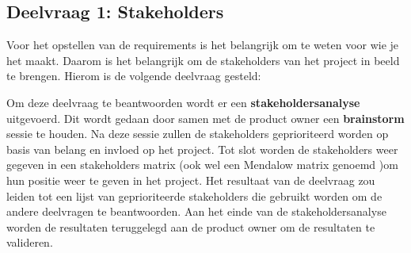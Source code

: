 \subsection{Deelvraag 1: Stakeholders}
Voor het opstellen van de requirements is het belangrijk om te weten voor wie je het maakt.
Daarom is het belangrijk om de stakeholders van het project in beeld te brengen.
Hierom is de volgende deelvraag gesteld:

\begin{center}
	\textit{\SubquestionOne}
\end{center}

\whitespace[0.2]
Om deze deelvraag te beantwoorden wordt er een \textbf{stakeholdersanalyse} uitgevoerd.
Dit wordt gedaan door samen met de product owner een \textbf{brainstorm} sessie te houden.
Na deze sessie zullen de stakeholders geprioriteerd worden op basis van belang en invloed op het project.
Tot slot worden de stakeholders weer gegeven in een stakeholders matrix (ook wel een Mendalow matrix genoemd \Parencite{MandelowMatrix})om hun positie weer te geven in het project.
Het resultaat van de deelvraag zou leiden tot een lijst van geprioriteerde stakeholders die gebruikt worden om de andere deelvragen te beantwoorden.
Aan het einde van de stakeholdersanalyse worden de resultaten teruggelegd aan de product owner om de resultaten te valideren.
